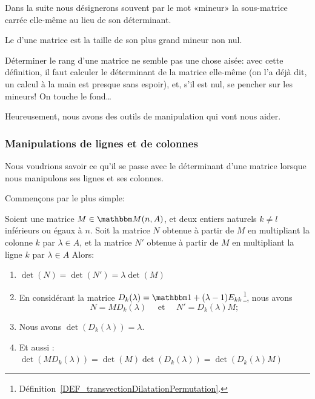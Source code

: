 Dans la suite nous désignerons souvent par le mot «mineur» la sous-matrice carrée elle-même au lieu de son déterminant.

\begin{definition}      \label{DEFooVVBYooJbliTi}
    Le  d'une matrice est la taille de son plus grand mineur non nul.
\end{definition}

Déterminer le rang d'une matrice ne semble pas une chose aisée: avec cette définition, il faut calculer le déterminant de la matrice elle-même (on l'a déjà dit, un calcul à la main est presque sans espoir), et, s'il est nul, se pencher sur les mineurs! On touche le fond\dots

Heureusement, nous avons des outils de manipulation qui vont nous aider.

\subsubsection{Manipulations de lignes et de colonnes}


Nous voudrions savoir ce qu'il se passe avec le déterminant d'une matrice lorsque nous manipulons ses lignes et ses colonnes.

Commençons par le plus simple:

\begin{proposition} \label{PROPooXUFKooOaPnna}
    Soient une matrice \( M\in \eM(n,A)\), et deux entiers naturels \( k\neq l\) inférieurs ou égaux à \( n\). Soit la matrice \( N\) obtenue à partir de \( M\) en multipliant la colonne \( k\) par \( \lambda\in A\), et la matrice \( N' \) obtenue à partir de \( M\) en multipliant la ligne \( k\) par \( \lambda\in A\)  Alors:
    \begin{enumerate}
        \item       \label{ITEMooBKIGooCDQEDt}
            \( \det(N) = \det(N') = \lambda\det(M)\)
        \item       \label{ITEMooWRRCooFXkRNW}
            En considérant la matrice \( D_k(\lambda)=\mtu+(\lambda-1)E_{kk}\)\footnote{Définition~\ref{DEF_transvectionDilatationPermutation}.}, nous avons
            \begin{equation}
                N=MD_k(\lambda) \quad\text{ et } \quad N'=D_k(\lambda)M;
            \end{equation}
        \item       \label{ITEMooOGGDooPVVRzk}
            Nous avons \( \det(D_k(\lambda))=\lambda\).
        \item       \label{ITEMooIFRVooWQYgkK}
            Et aussi : \( \det(MD_k(\lambda))=\det(M)\det(D_k(\lambda)) = \det(D_k(\lambda)M)\)
    \end{enumerate}
\end{proposition}

